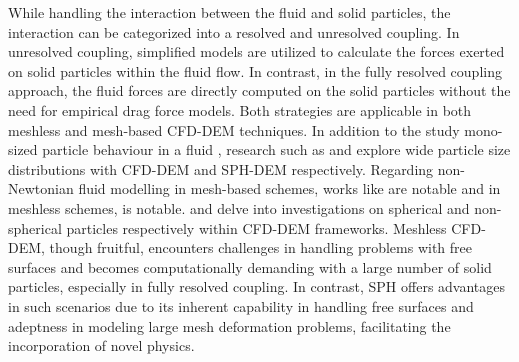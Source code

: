 \documentclass[preprint,12pt]{elsarticle}
\begin{document}
While handling the interaction between the fluid and solid particles, the
interaction can be categorized into a resolved and unresolved coupling.  In
unresolved coupling, simplified models are utilized to calculate the forces
exerted on solid particles within the fluid flow. In contrast, in the fully
resolved coupling approach, the fluid forces are directly computed on the
solid particles without the need for empirical drag force models.  Both
strategies are applicable in both meshless \cite{cleary2015prediction,
  trujillo2020smooth} and mesh-based \cite{van2008numerical, ma2022review}
CFD-DEM techniques.  In addition to the study mono-sized particle behaviour in
a fluid \cite{trujillo2020smooth}, research such as
\cite{brosh2014accelerating} and \cite{peng2021fully} explore wide particle
size distributions with CFD-DEM and SPH-DEM respectively.  Regarding
non-Newtonian fluid modelling in mesh-based schemes, works like
\cite{li2018dam} are notable and in meshless schemes, \cite{peng2021fully} is
notable. \citet{zhu2008discrete} and \citet{ma2022review} delve into
investigations on spherical and non-spherical particles respectively within
CFD-DEM frameworks.  Meshless CFD-DEM, though fruitful, encounters challenges
in handling problems with free surfaces and becomes computationally demanding
with a large number of solid particles, especially in fully resolved
coupling. In contrast, SPH offers advantages in such scenarios due to its
inherent capability in handling free surfaces and adeptness in modeling large
mesh deformation problems, facilitating the incorporation of novel physics.
\end{document}
